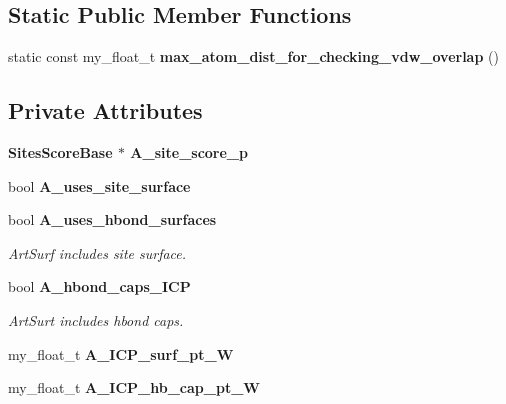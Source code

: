 \subsection*{Static Public Member Functions}
\begin{CompactItemize}
\item 
static const my\_\-float\_\-t \textbf{max\_\-atom\_\-dist\_\-for\_\-checking\_\-vdw\_\-overlap} ()\label{classASCbase_1_1IK__tests_06c9e7b5b2840ca8d74bd6582d883c83}

\end{CompactItemize}
\subsection*{Private Attributes}
\begin{CompactItemize}
\item 
\bf{Sites\-Score\-Base} $\ast$ \textbf{A\_\-site\_\-score\_\-p}\label{classASCbase_1_1IK__tests_d39cab900cbb424c333c3c51dbbecc0c}

\item 
bool \textbf{A\_\-uses\_\-site\_\-surface}\label{classASCbase_1_1IK__tests_b047df9991ddc5f5cfbdd35b245dac06}

\item 
bool \bf{A\_\-uses\_\-hbond\_\-surfaces}\label{classASCbase_1_1IK__tests_d7947e90a6605298f42be161830ec40e}

\begin{CompactList}\small\item\em Art\-Surf includes site surface. \item\end{CompactList}\item 
bool \bf{A\_\-hbond\_\-caps\_\-ICP}\label{classASCbase_1_1IK__tests_c47ea936905f2ff6b2815129ad205395}

\begin{CompactList}\small\item\em Art\-Surt includes hbond caps. \item\end{CompactList}\item 
my\_\-float\_\-t \textbf{A\_\-ICP\_\-surf\_\-pt\_\-W}\label{classASCbase_1_1IK__tests_f66ad10a0abe61813e9cc2dd01887cb1}

\item 
my\_\-float\_\-t \textbf{A\_\-ICP\_\-hb\_\-cap\_\-pt\_\-W}\label{classASCbase_1_1IK__tests_1096e6e78d144f78bf891188b0a5e18f}

\end{CompactItemize}
